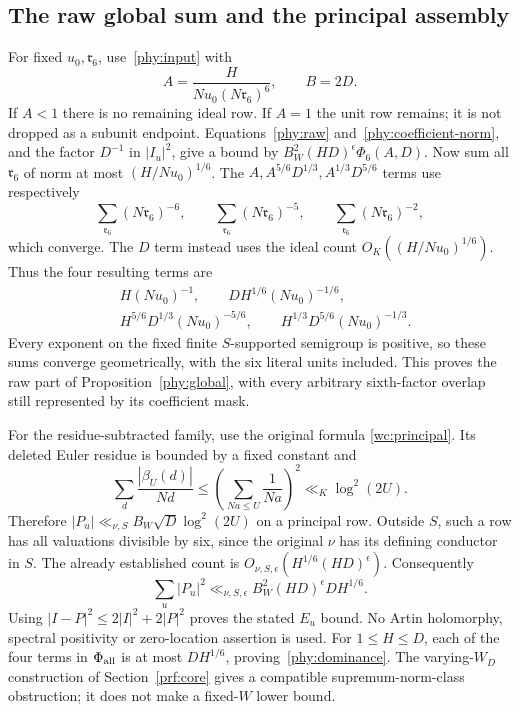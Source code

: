 \subsection{The raw global sum and the principal assembly}\label{phy:r6-sums}
For fixed $u_0,\mathfrak r_6$, use~\eqref{phy:input} with
\[
 A=\frac{H}{Nu_0(N\mathfrak r_6)^6},\qquad B=2D.
\]
If $A<1$ there is no remaining ideal row. If $A=1$ the unit row remains;
it is not dropped as a subunit endpoint. Equations~\eqref{phy:raw}
and~\eqref{phy:coefficient-norm}, and the factor $D^{-1}$ in $|I_u|^2$,
give a bound by $B_W^2(HD)^\epsilon\Phi_6(A,D)$.
Now sum all $\mathfrak r_6$ of norm at most $(H/Nu_0)^{1/6}$.
The $A,A^{5/6}D^{1/3},A^{1/3}D^{5/6}$ terms use respectively
\[
 \sum_{\mathfrak r_6}(N\mathfrak r_6)^{-6},\qquad
 \sum_{\mathfrak r_6}(N\mathfrak r_6)^{-5},\qquad
 \sum_{\mathfrak r_6}(N\mathfrak r_6)^{-2},
\]
which converge. The $D$ term instead uses the ideal count
$O_K((H/Nu_0)^{1/6})$. Thus the four resulting terms are
\begin{equation}\label{phy:S-sums}
 \begin{aligned}
 &H(Nu_0)^{-1},\qquad DH^{1/6}(Nu_0)^{-1/6},\\
 &H^{5/6}D^{1/3}(Nu_0)^{-5/6},\qquad
       H^{1/3}D^{5/6}(Nu_0)^{-1/3}.
 \end{aligned}
\end{equation}
Every exponent on the fixed finite $S$-supported semigroup is positive,
so these sums converge geometrically, with the six literal units included.
This proves the raw part of Proposition~\ref{phy:global}, with every
arbitrary sixth-factor overlap still represented by its coefficient mask.

For the residue-subtracted family, use the original formula
\eqref{wc:principal}. Its deleted Euler residue is bounded by a fixed
constant and
\[
 \sum_d\frac{|\beta_U(d)|}{Nd}
   \le\left(\sum_{Na\le U}\frac1{Na}\right)^2
   \ll_K\log^2(2U).
\]
Therefore $|P_u|\ll_{\nu,S}B_W\sqrt D\log^2(2U)$ on a principal row.
Outside $S$, such a row has all valuations divisible by six, since the
original $\nu$ has its defining conductor in $S$. The already established
count is $O_{\nu,S,\epsilon}(H^{1/6}(HD)^\epsilon)$. Consequently
\begin{equation}\label{phy:principal-proof}
 \sum_u|P_u|^2\ll_{\nu,S,\epsilon}
               B_W^2(HD)^\epsilon DH^{1/6}.
\end{equation}
Using $|I-P|^2\le2|I|^2+2|P|^2$ proves the stated $E_u$ bound.
No Artin holomorphy, spectral positivity or zero-location assertion is used.
For $1\le H\le D$, each of the four terms in $\Phi_{\rm all}$ is at most
$DH^{1/6}$, proving~\eqref{phy:dominance}.
The varying-$W_D$ construction of Section~\ref{prf:core} gives a compatible
supremum-norm-class obstruction; it does not make a fixed-$W$ lower bound.

